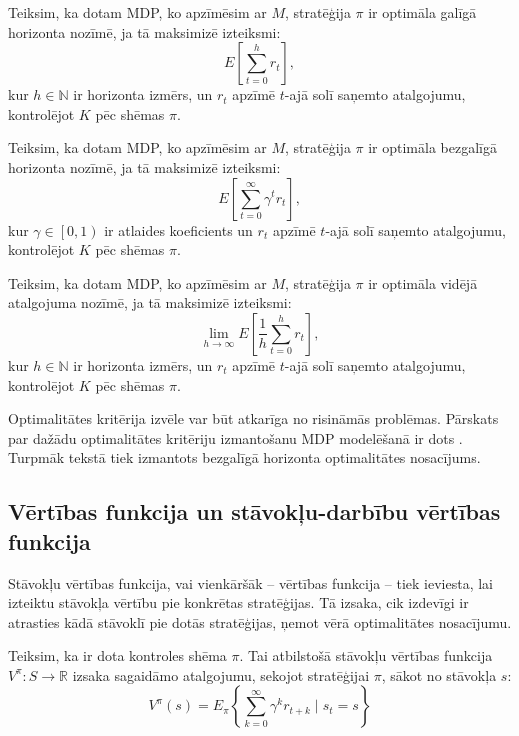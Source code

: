 \documentclass{ludis} %
\begin{document}
\begin{definicija}
Teiksim, ka dotam MDP, ko apzīmēsim ar $M$, stratēģija $\pi$ ir optimāla galīgā
horizonta nozīmē, ja tā maksimizē izteiksmi:
\[
	E\left[\sum_{t=0}^{h}r_t\right],
\]
kur $h \in \mathbb{N}$ ir horizonta izmērs, un $r_t$ apzīmē $t$-ajā solī saņemto
atalgojumu, kontrolējot $K$ pēc shēmas $\pi$.
\end{definicija}

\begin{definicija}
Teiksim, ka dotam MDP, ko apzīmēsim ar $M$, stratēģija $\pi$ ir optimāla
bezgalīgā horizonta nozīmē, ja tā maksimizē izteiksmi:
\[
	E\left[\sum_{t=0}^{\infty}\gamma^t r_t\right],
\]
kur $\gamma \in \left[0, 1\right)$ ir atlaides koeficients un $r_t$ apzīmē
$t$-ajā solī saņemto atalgojumu, kontrolējot $K$ pēc shēmas $\pi$.
\end{definicija}

\begin{definicija}
Teiksim, ka dotam MDP, ko apzīmēsim ar $M$, stratēģija $\pi$ ir optimāla vidējā
atalgojuma nozīmē, ja tā maksimizē izteiksmi:
\[
	\lim\limits_{h \rightarrow \infty} E\left[\frac{1}{h}\sum_{t=0}^{h}r_t\right],
\]
kur $h \in \mathbb{N}$ ir horizonta izmērs, un $r_t$ apzīmē $t$-ajā solī saņemto
atalgojumu, kontrolējot $K$ pēc shēmas $\pi$.
\end{definicija}

Optimalitātes kritērija izvēle var būt atkarīga no risināmās problēmas. Pārskats
par dažādu optimalitātes kritēriju izmantošanu MDP modelēšanā ir dots
\autocite{koenig2002interaction}. Turpmāk tekstā tiek izmantots bezgalīgā
horizonta optimalitātes nosacījums.


\subsection{Vērtības funkcija un stāvokļu-darbību vērtības funkcija}
Stāvokļu vērtības funkcija, vai vienkāršāk -- vērtības funkcija -- tiek
ieviesta, lai izteiktu stāvokļa vērtību pie konkrētas stratēģijas. Tā izsaka,
cik izdevīgi ir atrasties kādā stāvoklī pie dotās stratēģijas, ņemot vērā
optimalitātes nosacījumu.
\begin{definicija}
Teiksim, ka ir dota kontroles shēma $\pi$. Tai atbilstošā stāvokļu vērtības
funkcija $V^\pi : S \rightarrow \mathbb{R}$ izsaka sagaidāmo atalgojumu, sekojot
stratēģijai $\pi$, sākot no stāvokļa $s$:
\begin{equation} \label{eq:vpi}
	V^\pi (s) = E_\pi \left\{ \sum_{k=0}^{\infty} \gamma^k r_{t+k} \mid s_t = s\right\}
\end{equation}
\end{definicija}
\end{document}
